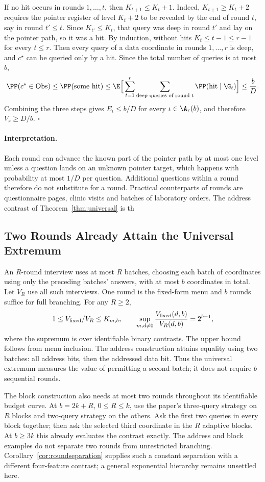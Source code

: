 If no hit occurs in rounds $1,\ldots,t$, then $K_{t+1}\le K_t+1$. Indeed,
$K_{t+1}\ge K_t+2$ requires the pointer register of level $K_t+2$ to be
revealed by the end of round $t$, say in round $t'\le t$. Since
$K_{t'}\le K_t$, that query was deep in round $t'$ and lay on the pointer path,
so it was a hit. By induction, without hits $K_t\le t-1\le r-1$ for every
$t\le r$. Then every query of a data coordinate in rounds $1,\ldots,r$ is deep,
and $c^\star$ can be queried only by a hit. Since the total number of queries
is at most $b$,
\[
 \PP(c^\star\in{\rm Obs})\le\PP(\text{some hit})
 \le\E\Big[\sum_{t=1}^r\sum_{\text{deep queries of round }t}\PP(\text{hit}\mid\G_t)\Big]
 \le\frac bD .
\]
Combining the three steps gives $E_\iota\le b/D$ for every $\iota\in\A_r(b)$,
and therefore $V_r\ge D/b$. \hfill$\square$



\paragraph{Interpretation.}
Each round can advance the known part of the pointer path by at most one
level unless a question lands on an unknown pointer target, which happens
with probability at most $1/D$ per question. Additional questions within a
round therefore do not substitute for a round. Practical counterparts of
rounds are questionnaire pages, clinic visits and batches of laboratory
orders. The address contrast of Theorem~\ref{thm:universal} is th
\subsection{Two Rounds Already Attain the Universal Extremum}\label{app:rounds}
An $R$-round interview uses at most $R$ batches, choosing each batch of coordinates using only the preceding batches' answers, with at most $b$ coordinates in total. Let $V_R$ use all such interviews. One round is the fixed-form menu and $b$ rounds suffice for full branching. For any $R\ge2$,
\[
 1\le V_{\rm fixed}/V_R\le K_{m,b},\qquad
 \sup_{m,d\ne0}\frac{V_{\rm fixed}(d,b)}{V_R(d,b)}=2^{b-1},
\]
where the supremum is over identifiable binary contrasts. The upper bound follows from menu inclusion. The address construction attains equality using two batches: all address bits, then the addressed data bit. Thus the universal extremum measures the value of permitting a second batch; it does not require $b$ sequential rounds.

The block construction also needs at most two rounds throughout its identifiable budget curve. At $b=2k+R$, $0\le R\le k$, use the paper's three-query strategy on $R$ blocks and two-query strategy on the others. Ask the first two queries in every block together; then ask the selected third coordinate in the $R$ adaptive blocks. At $b\ge3k$ this already evaluates the contrast exactly. The address and block examples do not separate two rounds from unrestricted branching. Corollary~\ref{cor:roundseparation} supplies such a constant separation with a different four-feature contrast; a general exponential hierarchy remains unsettled here.

